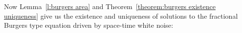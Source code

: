 \documentclass[a4paper,11pt]{article}
\theoremstyle{remark}
\newtheorem{remark}[theorem]{Remark}
\newcommand{\N}{\mathbb{N}}
\newcommand{\reso}{\,\mathord{\circ}\,}
\begin{document}
%   

Now Lemma~\ref{l:burgers area} and Theorem~\ref{theorem:burgers existence uniqueness} give us the existence and uniqueness of solutions to the fractional Burgers type equation driven by space-time white noise:
\end{document}
